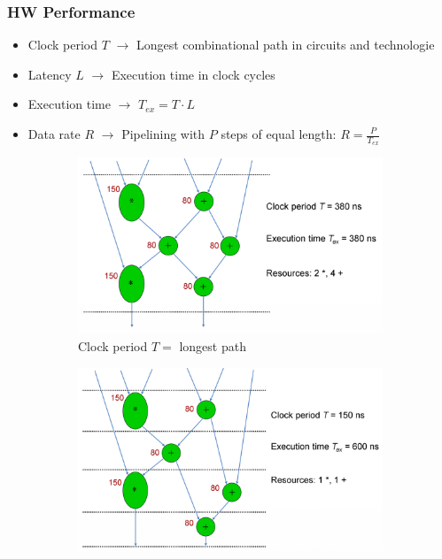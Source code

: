 \subsubsection{HW Performance}
\begin{itemize}
	\item Clock period $T$ $\rightarrow$ Longest combinational path in circuits and technologie
	\item Latency $L$ $\rightarrow$ Execution time in clock cycles
	\item Execution time $\rightarrow$ $T_{ex} = T \cdot L$
	\item Data rate $R$ $\rightarrow$ Pipelining with $P$ steps of equal length: $R = \frac{P}{T_{ex}}$
\end{itemize}

\begin{figure}[h]
	\begin{center}
		\begin{subfigure}[b]{0.45\textwidth}
			\includegraphics[width=\textwidth]{images/Performance_1.png}	
			\caption{Clock period $T = $ longest path }
		\end{subfigure}
		\hfill
		\begin{subfigure}[b]{0.45\textwidth}
			\includegraphics[width=\textwidth]{images/Performance_2.png}	

\end{subfigure}
\end{center}
\end{figure}
